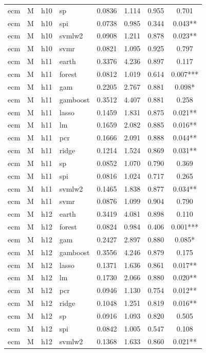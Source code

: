 \begin{ThreePartTable}
\begin{longtable}[t]{llclcccc}
ecm & M & h10 & sp & 0.0836 & 1.114 & 0.955 & 0.701\\
ecm & M & h10 & spi & 0.0738 & 0.985 & 0.344 & 0.043**\\
ecm & M & h10 & svmlw2 & 0.0908 & 1.211 & 0.878 & 0.023**\\
ecm & M & h10 & svmr & 0.0821 & 1.095 & 0.925 & 0.797\\
\addlinespace
ecm & M & h11 & earth & 0.3376 & 4.236 & 0.897 & 0.117\\
ecm & M & h11 & forest & 0.0812 & 1.019 & 0.614 & 0.007***\\
ecm & M & h11 & gam & 0.2205 & 2.767 & 0.881 & 0.098*\\
ecm & M & h11 & gamboost & 0.3512 & 4.407 & 0.881 & 0.258\\
ecm & M & h11 & lasso & 0.1459 & 1.831 & 0.875 & 0.021**\\
ecm & M & h11 & lm & 0.1659 & 2.082 & 0.885 & 0.016**\\
ecm & M & h11 & pcr & 0.1666 & 2.091 & 0.888 & 0.044**\\
ecm & M & h11 & ridge & 0.1214 & 1.524 & 0.869 & 0.031**\\
ecm & M & h11 & sp & 0.0852 & 1.070 & 0.790 & 0.369\\
ecm & M & h11 & spi & 0.0816 & 1.024 & 0.717 & 0.265\\
ecm & M & h11 & svmlw2 & 0.1465 & 1.838 & 0.877 & 0.034**\\
ecm & M & h11 & svmr & 0.0876 & 1.099 & 0.904 & 0.790\\
\addlinespace
ecm & M & h12 & earth & 0.3419 & 4.081 & 0.898 & 0.110\\
ecm & M & h12 & forest & 0.0824 & 0.984 & 0.406 & 0.001***\\
ecm & M & h12 & gam & 0.2427 & 2.897 & 0.880 & 0.085*\\
ecm & M & h12 & gamboost & 0.3556 & 4.246 & 0.879 & 0.175\\
ecm & M & h12 & lasso & 0.1371 & 1.636 & 0.861 & 0.017**\\
ecm & M & h12 & lm & 0.1730 & 2.066 & 0.880 & 0.020**\\
ecm & M & h12 & pcr & 0.0946 & 1.130 & 0.754 & 0.012**\\
ecm & M & h12 & ridge & 0.1048 & 1.251 & 0.819 & 0.016**\\
ecm & M & h12 & sp & 0.0916 & 1.093 & 0.820 & 0.505\\
ecm & M & h12 & spi & 0.0842 & 1.005 & 0.547 & 0.108\\
ecm & M & h12 & svmlw2 & 0.1368 & 1.633 & 0.860 & 0.021**\\

\end{longtable}
\end{ThreePartTable}
